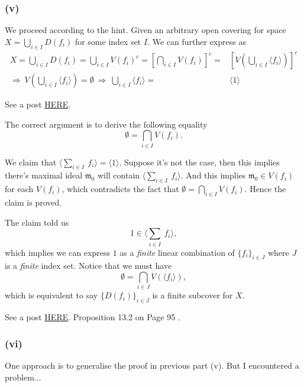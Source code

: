 \subsubsection{(v)}
We proceed according to the hint. 
Given an arbitrary open covering for space $X=\bigcup_{i\in I}D(f_i)$ for some index set $I$. 
We can further express as \begin{align*}
    X = \bigcup_{i\in I}D(f_i)
    = \bigcup_{i\in I} V(f_i)^c
    = \left[\bigcap_{i\in I} V(f_i)\right]^c
    =& \left[V\left(\bigcup_{i\in I}\langle f_i\rangle\right)\right]^c\\
    \Rightarrow~ V\left(\bigcup_{i\in I}\langle f_i\rangle\right)=\emptyset 
    ~\Rightarrow~ \bigcup_{i\in I}\langle f_i\rangle=&\langle 1\rangle
\end{align*}  

See a post \href{https://math.stackexchange.com/questions/104248/compactness-of-operatornamespeca}{HERE}. 

The correct argument is to derive the following equality
$$\emptyset = \bigcap_{i\in I} V(f_i).$$

We claim that $\langle \sum_{i\in I}~ f_i\rangle= \langle 1\rangle$. Suppose it's not the case, then this implies there's maximal ideal $\mathfrak m_0$ will contain $\langle \sum_{i\in I}~ f_i\rangle$. And this implies $\mathfrak m_0\in V(f_i)$ for each $V(f_i)$, which contradicts the fact that $\emptyset = \bigcap_{i\in I} V(f_i)$. Hence the claim is proved. 

The claim told us $$1\in \langle \sum_{i\in I}~ f_i\rangle,$$ which implies we can express $1$ as a \textit{finite} linear combination of $\{f_i\}_{i\in J}$ where $J$ is a \textit{finite} index set. Notice that we must have $$\emptyset=\bigcap_{i\in J}V(\langle f_i\rangle),$$ which is equivalent to say $\{D(f_i)\}_{i\in J}$ is a finite subcover for $X$.

See a post \href{https://math.stackexchange.com/questions/2319058/proof-verification-zariski-topology-is-quasi-compact}{HERE}. Proposition 13.2 on Page 95 \cite{altman}. 

\subsubsection{(vi)}
One approach is to generalise the proof in previous part (v). But I encountered a problem...

